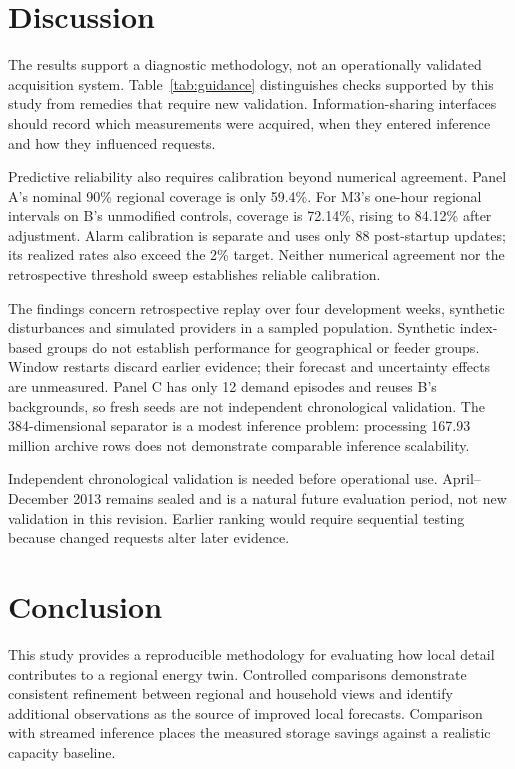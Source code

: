 \documentclass[conference]{IEEEtran}
\begin{document}
\section{Discussion}
The results support a diagnostic methodology, not an operationally validated acquisition system. Table~\ref{tab:guidance} distinguishes checks supported by this study from remedies that require new validation. Information-sharing interfaces should record which measurements were acquired, when they entered inference and how they influenced requests.



Predictive reliability also requires calibration beyond numerical agreement. Panel A's nominal 90\% regional coverage is only 59.4\%. For M3's one-hour regional intervals on B's unmodified controls, coverage is 72.14\%, rising to 84.12\% after adjustment. Alarm calibration is separate and uses only 88 post-startup updates; its realized rates also exceed the 2\% target. Neither numerical agreement nor the retrospective threshold sweep establishes reliable calibration.

The findings concern retrospective replay over four development weeks, synthetic disturbances and simulated providers in a sampled population. Synthetic index-based groups do not establish performance for geographical or feeder groups. Window restarts discard earlier evidence; their forecast and uncertainty effects are unmeasured. Panel C has only 12 demand episodes and reuses B's backgrounds, so fresh seeds are not independent chronological validation. The 384-dimensional separator is a modest inference problem: processing 167.93 million archive rows does not demonstrate comparable inference scalability.

Independent chronological validation is needed before operational use. April--December 2013 remains sealed and is a natural future evaluation period, not new validation in this revision. Earlier ranking would require sequential testing because changed requests alter later evidence.


\balance
\section{Conclusion}
This study provides a reproducible methodology for evaluating how local detail contributes to a regional energy twin. Controlled comparisons demonstrate consistent refinement between regional and household views and identify additional observations as the source of improved local forecasts. Comparison with streamed inference places the measured storage savings against a realistic capacity baseline.
\end{document}
